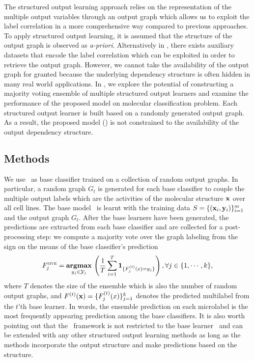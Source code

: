 {%
The structured output learning approach relies on the representation of the multiple output variables through an output graph which allows us to exploit the label correlation in a more comprehensive way compared to previous approaches.
To apply structured output learning, it is assumed that the structure of the output graph is observed as \textit{a-priori}.
Alternatively in , there exists auxiliary datasets that encode the label correlation which can be exploited in order to retrieve the output graph.
However, we cannot take the availability of the output graph for granted because the underlying dependency structure is often hidden in many real world applications.
In , we explore the potential of constructing a majority voting ensemble of multiple structured output learners and examine the performance of the proposed model on molecular classification problem.
Each structured output learner is built based on a randomly generated output graph.
As a result, the proposed model (\mve) is not constrained to the availability of the output dependency structure.



%
%
\subsection{Methods}

We use \mmcrf\ as base classifier trained on a collection of random output graphs.
In particular, a random graph $G_t$ is generated for each base classifier to couple the multiple output labels which are the activities of the molecular structure $\mathbf {x}$ over all cell lines.
The base model \mmcrf\ is learnt with the training data $S=\{(\mathbf {x}_i,\mathbf {y}_i)\}_{i=1}^{m}$ and the output graph $G_t$.
After the base learners have been generated, the predictions are extracted from each base classifier and are collected for a post-processing step: we compute a majority vote over the graph labeling from the sign on the means of the base classifier's prediction
\begin{align*}
	F_j^{\text{{\sc mve}}}=\underset{y_j\in\mathcal{Y}_j}{\textbf{argmax}}\,\left(\frac{1}{T}\sum_{i=1}^{T}\mathbf{1}_{\{F_j^{(t)}(x)=y_j\}}\right), \forall j\in\{1,\cdots,k\},
\end{align*}
where $T$ denotes the size of the ensemble which is also the number of random output graphs, and $F^{(t)}(\mathbf {x})=\{F^{(t)}_j(x)\}_{j=1}^{k}$ denotes the predicted multilabel from the $t$'th base learner.
In words, the ensemble prediction on each microlabel is the most frequently appearing prediction among the base classifiers.
It is also worth pointing out that the \mve\ framework is not restricted to the base learner \mmcrf\ and can be extended with any other structured output learning methods as long as the methods incorporate the output structure and make predictions based on the structure.

}
